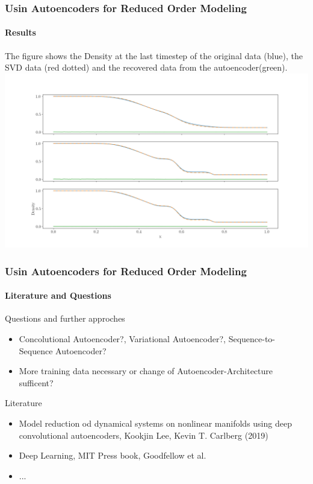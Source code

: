 \documentclass{beamer}
\begin{document}
	\begin{frame}
		\frametitle{Usin Autoencoders for Reduced Order Modeling}
		\framesubtitle{Results}
		The figure shows the Density at the last timestep of the original data (blue), the SVD data (red dotted) and the recovered data from the autoencoder(green).
		\includegraphics[width=\linewidth]{figures/density.png}
	\end{frame}
	\begin{frame}
		\frametitle{Usin Autoencoders for Reduced Order Modeling}
		\framesubtitle{Literature and Questions}
			Questions and further approches
			\begin{itemize}
				\item Concolutional Autoencoder?, Variational Autoencoder?, Sequence-to-Sequence Autoencoder?
				\item More training data necessary or change of Autoencoder-Architecture sufficent?
			\end{itemize}
			Literature
			\begin{itemize}
			\item Model reduction od dynamical systems on nonlinear manifolds using deep convolutional autoencoders, Kookjin Lee, Kevin T. Carlberg (2019)
			\item Deep Learning, MIT Press book, Goodfellow et al.
			\item ...
			\end{itemize}

	\end{frame}
\end{document}
